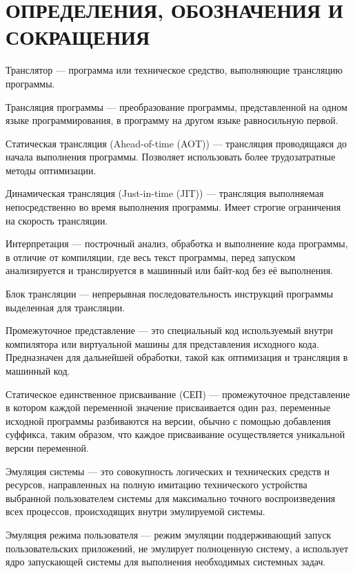 \section*{ОПРЕДЕЛЕНИЯ, ОБОЗНАЧЕНИЯ И СОКРАЩЕНИЯ}

Транслятор --- программа или техническое средство, выполняющие трансляцию программы. \cite{translate}

Трансляция программы --- преобразование программы, представленной на одном языке программирования, в программу на другом языке равносильную первой. \cite{translate}

Статическая трансляция (Ahead-of-time (AOT)) --- трансляция проводящаяся до начала выполнения программы. Позволяет использовать более трудозатратные методы оптимизации.

Динамическая трансляция (Just-in-time (JIT)) --- трансляция выполняемая непосредственно во время выполнения программы. Имеет строгие ограничения на скорость трансляции.

Интерпретация --- построчный анализ, обработка и выполнение кода программы, в отличие от компиляции, где весь текст программы, перед запуском анализируется и транслируется в машинный или байт-код без её выполнения. \cite{interpret}

Блок трансляции --- непрерывная последовательность инструкций программы выделенная для трансляции.

Промежуточное представление ---  это специальный код используемый внутри компилятора или виртуальной машины для представления исходного кода. Предназначен для дальнейшей обработки, такой как оптимизация и трансляция в машинный код.

Статическое единственное присваивание (СЕП) --- промежуточное представление в котором каждой переменной значение присваивается один раз, переменные исходной программы разбиваются на версии, обычно с помощью добавления суффикса, таким образом, что каждое присваивание осуществляется уникальной версии переменной.

Эмуляция системы --- это совокупность логических и технических средств и ресурсов, направленных на полную имитацию технического устройства выбранной пользователем системы для максимально точного воспроизведения всех процессов, происходящих внутри эмулируемой системы. 

Эмуляция режима пользователя --- режим эмуляции поддерживающий запуск пользовательских приложений, не эмулирует полноценную систему, а использует ядро запускающей системы для выполнения необходимых системных задач.

